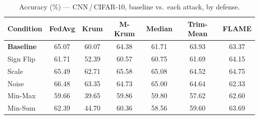 \begin{table}[t]
\centering
\caption{Accuracy (\%) --- CNN\,/\,CIFAR-10, baseline vs.\ each attack, by defense.}
\label{tab:cnn_accuracy}
\footnotesize
\begin{tabular}{lcccccc}
\toprule
Condition & FedAvg & Krum & M-Krum & Median & Trim-Mean & FLAME \\
\midrule
\textbf{Baseline} & 65.07 & 60.07 & 64.38 & 61.71 & 63.93 & 63.37 \\
\midrule
Sign Flip & 61.71 & 52.39 & 60.57 & 60.75 & 61.69 & 64.15 \\
Scale & 65.49 & 62.71 & 65.58 & 65.08 & 64.52 & 64.75 \\
Noise & 66.48 & 63.35 & 64.73 & 65.00 & 64.64 & 62.33 \\
Min-Max & 59.66 & 39.65 & 59.86 & 59.80 & 57.62 & 62.60 \\
Min-Sum & 62.39 & 44.70 & 60.36 & 58.56 & 59.60 & 63.69 \\
\bottomrule
\end{tabular}
\end{table}
